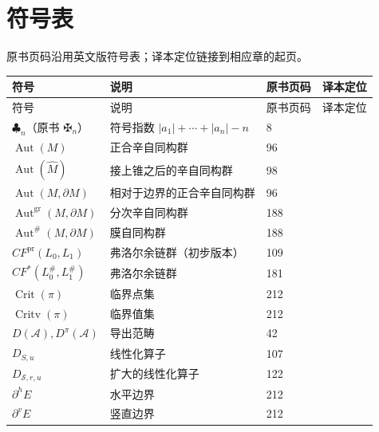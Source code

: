 \chapter*{符号表}

原书页码沿用英文版符号表；译本定位链接到相应章的起页。

\begingroup
\small\raggedright
\begin{longtable}{@{}p{.26\linewidth}p{.41\linewidth}p{.12\linewidth}p{.12\linewidth}@{}}
\toprule 符号 & 说明 & 原书页码 & 译本定位\\\midrule
\endfirsthead
\toprule 符号 & 说明 & 原书页码 & 译本定位\\\midrule
\endhead
\(\clubsuit_n\)（原书 \(\maltese_n\)） & 符号指数 \(|a_1|+\cdots+|a_n|-n\) & 8 & \pageref{ch:01-definitions}\\
\(\operatorname{Aut}(M)\) & 正合辛自同构群 & 96 & \pageref{ch:07-symplectic-geometry}\\
\(\operatorname{Aut}(\widehat M)\) & 接上锥之后的辛自同构群 & 98 & \pageref{ch:07-symplectic-geometry}\\
\(\operatorname{Aut}(M,\partial M)\) & 相对于边界的正合辛自同构群 & 96 & \pageref{ch:07-symplectic-geometry}\\
\(\operatorname{Aut}^{\mathrm{gr}}(M,\partial M)\) & 分次辛自同构群 & 188 & \pageref{ch:12-fukaya-complete}\\
\(\operatorname{Aut}^{\#}(M,\partial M)\) & 膜自同构群 & 188 & \pageref{ch:12-fukaya-complete}\\
\(CF^{\mathrm{pr}}(L_0,L_1)\) & 弗洛尔余链群（初步版本） & 109 & \pageref{ch:08-classical-floer}\\
\(CF^*(L_0^\#,L_1^\#)\) & 弗洛尔余链群 & 181 & \pageref{ch:12-fukaya-complete}\\
\(\operatorname{Crit}(\pi)\) & 临界点集 & 212 & \pageref{ch:15-first-notions}\\
\(\operatorname{Critv}(\pi)\) & 临界值集 & 212 & \pageref{ch:15-first-notions}\\
\(D(\mathcal A),D^\pi(\mathcal A)\) & 导出范畴 & 42 & \pageref{ch:03-exact-triangles}\\
\(D_{S,u}\) & 线性化算子 & 107 & \pageref{ch:08-classical-floer}\\
\(D_{\mathcal S,r,u}\) & 扩大的线性化算子 & 122 & \pageref{ch:09-fukaya-preliminary}\\
\(\partial^h E\) & 水平边界 & 212 & \pageref{ch:15-first-notions}\\
\(\partial^v E\) & 竖直边界 & 212 & \pageref{ch:15-first-notions}\\

\end{longtable}
